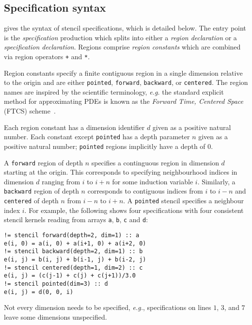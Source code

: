 \documentclass[10pt,preprint,numbers]{sigplanconf}
\theoremstyle{definition}
\newcommand{\eg}{\emph{e.g.}}
\newcommand{\nonterm}[1]{\textit{#1}}
\newcommand{\term}[1]{\texttt{#1}}
\begin{document}
\subsection{Specification syntax}
\label{subsec:syntax}

 gives the syntax of stencil specifications, which is
detailed below. The entry point is the \nonterm{specification} production which
splits into either a \emph{region declaration} or a \emph{specification
declaration}.
Regions comprise \emph{region constants} which are
combined via region operators \term{+} and \term{*}.


Region constants specify a finite contiguous region in a
single dimension relative to the origin and are either \term{pointed},
\term{forward}, \term{backward}, or \term{centered}. The region names are
inspired by the scientific terminology, \eg{} the standard explicit method for
approximating PDEs is known as the \emph{Forward Time, Centered Space} (FTCS)
scheme~\citep{dawson1991finite}.

Each region
constant has a dimension identifier $d$ given as a positive natural number.
Each constant except \term{pointed} has a depth
parameter $n$ given as a positive natural number; \term{pointed}
regions implicitly have a depth of $0$.

A \term{forward} region of depth $n$ specifies a continguous
region in dimension $d$ starting at the origin. This corresponds
to specifying neighbourhood indices in dimension $d$ ranging from $i$ to $i + n$
for some induction variable $i$. Similarly, a
\term{backward} region of depth $n$ corresponds to contiguous indices
from $i$ to $i - n$ and \term{centered}
of depth $n$ from $i - n$ to $i + n$. A \term{pointed}
stencil specifies a neighbour index $i$. For example, the
following shows four specifications with four consistent stencil
kernels reading from arrays \term{a}, \term{b}, \term{c} and \term{d}:
\begin{verbatim}
!= stencil forward(depth=2, dim=1) :: a
e(i, 0) = a(i, 0) + a(i+1, 0) + a(i+2, 0)
!= stencil backward(depth=2, dim=1) :: b
e(i, j) = b(i, j) + b(i-1, j) + b(i-2, j)
!= stencil centered(depth=1, dim=2) :: c
e(i, j) = (c(j-1) + c(j) + c(j+1))/3.0
!= stencil pointed(dim=3) :: d
e(i, j) = d(0, 0, i)
\end{verbatim}
Not every dimension needs to be specified, \eg{},
specifications on lines $1$, $3$, and $7$ leave some dimensions unspecified.
\end{document}
